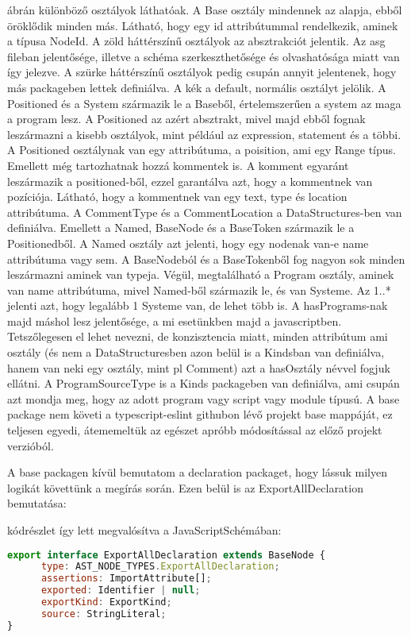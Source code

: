  ábrán különböző osztályok láthatóak. A Base osztály mindennek az alapja, ebből öröklődik minden más.
Látható, hogy egy id attribútummal rendelkezik, aminek a típusa NodeId.
A zöld háttérszínű osztályok az absztrakciót jelentik. Az asg fileban jelentősége, illetve a schéma szerkeszthetősége és olvashatósága miatt van így jelezve.
A szürke háttérszínű osztályok pedig csupán annyit jelentenek, hogy más packageben lettek definiálva.
A kék a default, normális osztályt jelölik.
A Positioned és a System származik le a Baseből, értelemszerűen a system az maga a program lesz.
A Positioned az azért absztrakt, mivel majd ebből fognak leszármazni a kisebb osztályok, mint például az expression, statement és a többi.
A Positioned osztálynak van egy attribútuma, a poisition, ami egy Range típus. Emellett még tartozhatnak hozzá kommentek is.
A komment egyaránt leszármazik a positioned-ből, ezzel garantálva azt, hogy a kommentnek van pozíciója.
Látható, hogy a kommentnek van egy text, type és location attribútuma. A CommentType és a CommentLocation a DataStructures-ben van definiálva.
Emellett a Named, BaseNode és a BaseToken származik le a Positionedből. A Named osztály azt jelenti, hogy egy nodenak van-e name attribútuma vagy sem.
A BaseNodeból és a BaseTokenből fog nagyon sok minden leszármazni aminek van typeja.
Végül, megtalálható a Program osztály, aminek van name attribútuma, mivel Named-ből származik le, és van Systeme. Az 1..* jelenti azt, hogy legalább 1 Systeme van, de lehet több is.
A hasPrograms-nak majd máshol lesz jelentősége, a mi esetünkben majd a javascriptben.
Tetszőlegesen el lehet nevezni, de konzisztencia miatt, minden attribútum ami osztály (és nem a DataStructuresben azon belül is a Kindsban van definiálva, hanem van neki egy osztály, mint pl Comment)
azt a hasOsztály névvel fogjuk ellátni.
A ProgramSourceType is a Kinds packageben van definiálva, ami csupán azt mondja meg, hogy az adott program vagy script vagy module típusú.
A base package nem követi a typescript-eslint githubon lévő projekt base mappáját, ez teljesen egyedi, átememeltük az egészet apróbb módosítással az előző projekt verzióból.

\noindent

A base packagen kívül bemutatom a declaration packaget, hogy lássuk milyen logikát követtünk a megírás során.
Ezen belül is az ExportAllDeclaration bemutatása:

 kódrészlet így lett megvalósítva a JavaScriptSchémában:
\begin{lstlisting}[caption={ExportAllDeclaration typescriptes megvalósítása},label={lst:ExportAllDeclaration}, language={JavaScript}]
export interface ExportAllDeclaration extends BaseNode {
      type: AST_NODE_TYPES.ExportAllDeclaration;
      assertions: ImportAttribute[];
      exported: Identifier | null;
      exportKind: ExportKind;
      source: StringLiteral;
}
\end{lstlisting}

